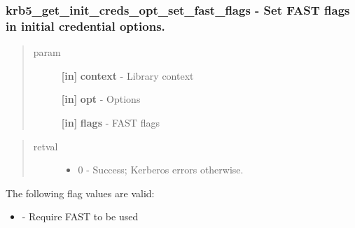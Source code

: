 \documentclass[letterpaper,10pt,english]{sphinxmanual}
\begin{document}
\subsubsection{krb5\_get\_init\_creds\_opt\_set\_fast\_flags -  Set FAST flags in initial credential options.}
\label{appdev/refs/api/krb5_get_init_creds_opt_set_fast_flags:krb5-get-init-creds-opt-set-fast-flags-set-fast-flags-in-initial-credential-options}\label{appdev/refs/api/krb5_get_init_creds_opt_set_fast_flags::doc}

\begin{fulllineitems}
\label{appdev/refs/api/krb5_get_init_creds_opt_set_fast_flags:krb5_get_init_creds_opt_set_fast_flags}
\end{fulllineitems}

\begin{quote}\begin{description}
\item[{param}] \leavevmode
\textbf{{[}in{]}} \textbf{context} - Library context

\textbf{{[}in{]}} \textbf{opt} - Options

\textbf{{[}in{]}} \textbf{flags} - FAST flags

\end{description}\end{quote}
\begin{quote}\begin{description}
\item[{retval}] \leavevmode\begin{itemize}
\item {} 
0   - Success; Kerberos errors otherwise.

\end{itemize}

\end{description}\end{quote}

The following flag values are valid:
\begin{itemize}
\item {} 
{\hyperref[appdev/refs/macros/KRB5_FAST_REQUIRED:KRB5_FAST_REQUIRED]{}} - Require FAST to be used

\end{itemize}
\end{document}
